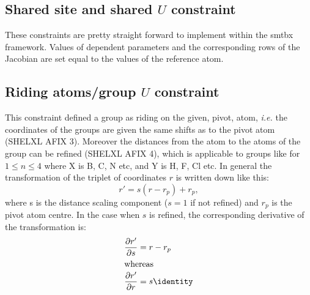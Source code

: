 \documentclass[pdf]{iucr}
\begin{document}
\subsection{Shared site and shared $U$ constraint}
These constraints are pretty straight forward to implement within the smtbx framework. Values of dependent parameters and the corresponding rows of the Jacobian are set equal to the values of the reference atom.

\subsection{Riding atoms/group $U$ constraint}
This constraint defined a group as riding on the given, pivot, atom, \emph{i.e.} the coordinates of the groups are given the same shifts as to the pivot atom (SHELXL AFIX 3). Moreover the distances from the atom to the atoms of the group can be refined (SHELXL AFIX 4), which is applicable to groups like  for $1 \leq n \leq 4$ where X is B, C, N etc, and Y is H, F, Cl etc. In general the transformation of the triplet of coordinates $r$ is written down like this:
\begin{equation}
r' = s(r-r_{p}) + r_{p}, \label{eqn:isometry}
\end{equation}
where s is the distance scaling component ($s=1$ if not refined) and $r_{p}$ is the pivot atom centre. In the case when $s$ is refined, the corresponding derivative of the transformation is:
\begin{align}
\partialder{r'}{s} &= r-r_{p} \\
\intertext{whereas}
\partialder{r'}{r} &= s \identity
\end{align}
\end{document}
